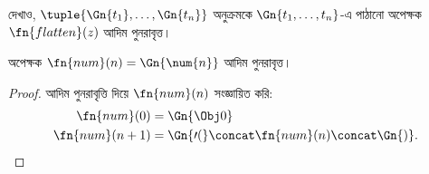 \documentclass[../../../include/open-logic-section]{subfiles}
\begin{document}
\begin{prob}
দেখাও, $\tuple{\Gn{t_1}, \dots, \Gn{t_n}}$ অনুক্রমকে
$\Gn{t_1, \dots, t_n}$-এ পাঠানো অপেক্ষক $\fn{flatten}(z)$ আদিম পুনরাবৃত্ত।
\end{prob}

\begin{prop}
  অপেক্ষক $\fn{num}(n) = \Gn{\num{n}}$ আদিম পুনরাবৃত্ত।
\end{prop}

\begin{proof}
  আদিম পুনরাবৃত্তি দিয়ে $\fn{num}(n)$ সংজ্ঞায়িত করি:
  \begin{align*}
    \fn{num}(0) & = \Gn{\Obj 0}\\
    \fn{num}(n+1) & = \Gn{\prime(} \concat \fn{num}(n) \concat \Gn{)}.
  \end{align*}
\end{proof}
\end{document}
